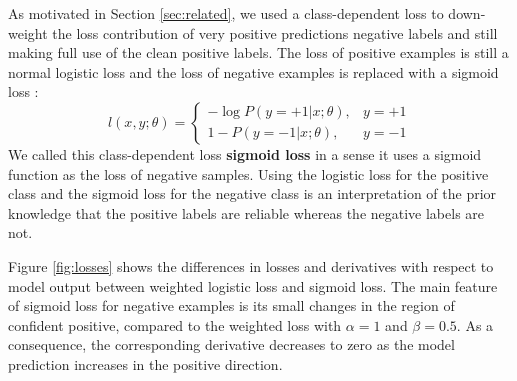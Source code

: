 As motivated in Section \ref{sec:related}, we used a class-dependent loss to down-weight the loss contribution of very positive predictions negative labels and still making full use of the clean positive labels.
The loss of positive examples is still a normal logistic loss and the loss of negative examples is replaced with a sigmoid loss \cite{tax2016class}:
\[
  l(x, y; \theta) =
    \begin{cases}
      - \log P(y=+1 \vert x; \theta), & y = +1 \\
      1 - P(y=-1 \vert x; \theta), & y = -1
    \end{cases}
\]
We called this class-dependent loss \textbf{sigmoid loss} in a sense it uses a sigmoid function as the loss of negative samples.
Using the logistic loss for the positive class and the sigmoid loss for the negative class is an interpretation of the prior knowledge that the positive labels are reliable whereas the negative labels are not.

Figure \ref{fig:losses} shows the differences in losses and derivatives with respect to model output between weighted logistic loss and sigmoid loss.
The main feature of sigmoid loss for negative examples is its small changes in the region of confident positive, compared to the weighted loss with $\alpha=1$ and $\beta=0.5$.
As a consequence, the corresponding derivative decreases to zero as the model prediction increases in the positive direction.


